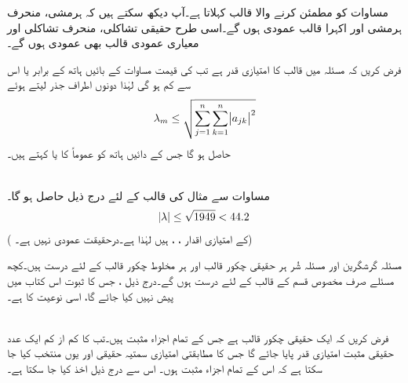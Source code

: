 مساوات  کو مطمئن کرنے والا قالب  کہلاتا ہے۔آپ دیکھ سکتے ہیں کہ ہرمشی، منحرف ہرمشی اور اکہرا قالب عمودی ہوں گے۔اسی طرح حقیقی تشاکلی، منحرف تشاکلی اور معیاری عمودی قالب بھی عمودی ہوں گے۔

فرض کریں کہ مسئلہ  میں قالب  کا امتیازی قدر  ہے تب  کی قیمت  مساوات  کے بائیں ہاتھ کے برابر یا اس سے کم ہو گی لہٰذا دونوں اطراف جذر لیتے ہوئے
\begin{align}\label{مساوات_خطی_اعدادی_عدم_شر_پ}
\lambda_m\le \sqrt{ \sum_{j=1}^{n}\sum_{k=1}^{n}\abs{a_{jk}}^2}
\end{align}
حاصل ہو گا جس کے دائیں ہاتھ کو عموماً   کا  یا  کہتے ہیں۔ 

\quad {}\\
مساوات  سے مثال  کی قالب  کے لئے درج ذیل حاصل ہو گا۔
\begin{align*}
\abs{\lambda}\le \sqrt{1949}<44.2
\end{align*}
( کے امتیازی اقدار ، ،  ہیں لہٰذا  ہے۔درحقیقت  عمودی نہیں ہے۔)

مسئلہ گرشگرین اور مسئلہ شُر ہر حقیقی چکور قالب اور ہر مخلوط چکور قالب کے لئے درست ہیں۔کچھ مسئلے صرف مخصوص قسم کے قالب کے لئے درست ہوں گے۔درج ذیل ،  جس کا ثبوت اس کتاب میں پیش نہیں کیا جائے گا، اسی نوعیت کا ہے۔ 

\quad {}\\
فرض کریں کہ  ایک حقیقی چکور قالب ہے جس کے تمام اجزاء مثبت ہیں۔تب  کا کم از کم ایک عدد حقیقی مثبت امتیازی قدر پایا جائے گا جس کا مطابقتی امتیازی سمتیہ حقیقی اور یوں منتخب کیا جا سکتا ہے کہ اس کے تمام اجزاء مثبت ہوں۔
اس سے درج ذیل   اخذ کیا جا سکتا ہے۔

